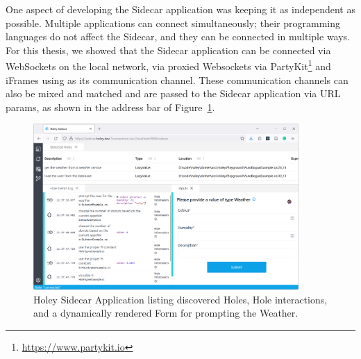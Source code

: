 One aspect of developing the Sidecar application was keeping it as independent as possible.
Multiple applications can connect simultaneously; their programming languages do not affect the Sidecar, and they can be connected in multiple ways.
For this thesis, we showed that the Sidecar application can be connected via WebSockets on the local network, via proxied Websockets via PartyKit\footnote{\url{https://www.partykit.io}} and iFrames using \texttt{} as its communication channel.
These communication channels can also be mixed and matched and are passed to the Sidecar application via URL params, as shown in the address bar of Figure~\ref{fig:holey-sidecar}.

\begin{figure}[ht]
    \centering
    \includegraphics[width=0.9\textwidth]{images/sidecar}
    \caption{Holey Sidecar Application listing discovered Holes, Hole interactions, and a dynamically rendered Form for prompting the Weather.}
    \label{fig:holey-sidecar}
\end{figure}